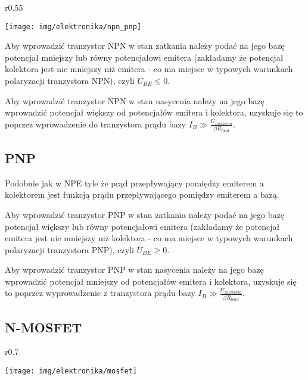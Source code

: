\documentclass{pdfBooklets}
\begin{document}
\begin{wrapfigure}{r}{0.55\textwidth}
  \begin{center}
    \texttt{[image: img/elektronika/npn\_pnp]}
    \vspace{-20pt}
  \end{center}
\end{wrapfigure}

Aby wprowadzić tranzystor NPN w stan zatkania należy podać na jego bazę potencjał mniejszy lub równy potencjałowi emitera (zakładamy że potencjał kolektora jest nie mniejszy niż emitera - co ma miejsce w typowych warunkach polaryzacji tranzystora NPN), czyli $U_{BE} \leq 0$.

Aby wprowadzić tranzystor NPN w stan nasycenia należy na jego bazę wprowadzić potencjał większy od potencjałów emitera i kolektora, uzyskuje się to poprzez wprowadzenie do tranzystora prądu bazy $I_B \gg \frac{U_{zasilania}}{\beta R_{load}}$.

\subsection{PNP}
Podobnie jak w NPE tyle że prąd przepływający pomiędzy emiterem a kolektorem jest funkcją prądu przepływającego pomiędzy emiterem a bazą.

Aby wprowadzić tranzystor PNP w stan zatkania należy podać na jego bazę potencjał większy lub równy potencjałowi emitera (zakładamy że potencjał emitera jest nie mniejszy niż kolektora - co ma miejsce w typowych warunkach polaryzacji tranzystora PNP), czyli $U_{BE} \geq 0$.

Aby wprowadzić tranzystor PNP w stan nasycenia należy na jego bazę wprowadzić potencjał mniejszy od potencjałów emitera i kolektora, uzyskuje się to poprzez wyprowadzenie z tranzystora prądu bazy $I_B \gg \frac{U_{zasilania}}{\beta R_{load}}$.

\subsection{N-MOSFET}

\begin{wrapfigure}{r}{0.7\textwidth}
  \begin{center}
    \vspace{-40pt}
    \texttt{[image: img/elektronika/mosfet]}
    \vspace{-20pt}
  \end{center}
\end{wrapfigure}
\end{document}
